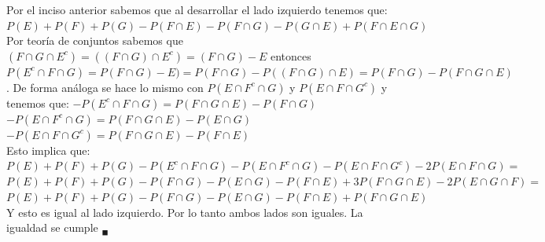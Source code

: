 \documentclass[12pt,a4paper]{report}
\begin{document}
\begin{enumerate}
{\begin{center}
	\end{center}
	Por el inciso anterior sabemos que al desarrollar el lado izquierdo tenemos que:\\
	$P(E)+P(F)+P(G)-P(F\cap E)-P(F\cap G) -P( G\cap E)+P(F\cap E \cap G)$\\
	Por teoría de conjuntos sabemos que $(F\cap G \cap E^c) = ((F \cap G) \cap E^c)=(F\cap G)-E$ entonces $P(E^c\cap F \cap G) = P(F\cap G) - E) = P(F\cap G) -P((F\cap G) \cap E)= P(F\cap G)-P(F\cap G \cap E)$. De forma análoga se hace lo mismo con $P(E\cap F^c \cap G) $ y $P(E \cap F \cap G^c)$ y tenemos que:
	$-P(E^c \cap F \cap G) = P(F\cap G \cap E) - P(F\cap G)$\\
	$-P(E \cap F^c \cap G) = P(F\cap G \cap E) - P(E\cap G)$\\
	$-P(E \cap F \cap G^c) = P(F\cap G \cap E) - P(F\cap E)$\\
	Esto implica que:\\
	$P(E)+P(F)+P(G)-P(E^c \cap F \cap G)-P(E \cap F^c \cap G)-P(E \cap F \cap G^c)-2P(E\cap F \cap G)=$\\
	$P(E)+P(F)+P(G)-P(F\cap G)-P(E\cap G)-P(F\cap E) +3P(F\cap G \cap E) -2P(E\cap G \cap F)=$\\
	$P(E)+P(F)+P(G)-P(F\cap G) - P(E \cap G) - P(F \cap E) +P(F\cap G \cap E)$\\
	Y esto es igual al lado izquierdo. Por lo tanto ambos lados son iguales. La igualdad se cumple $_{\blacksquare}$

	}


\end{enumerate}
\end{document}
